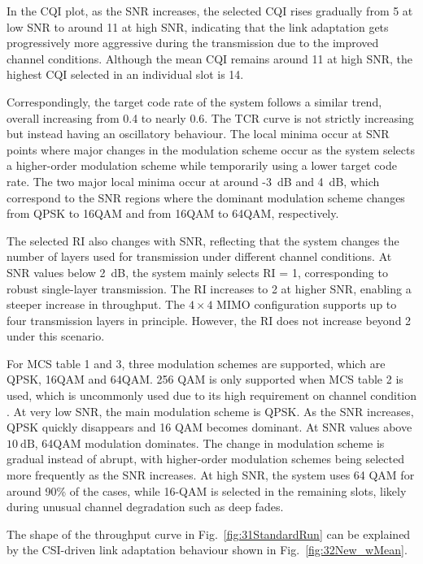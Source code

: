 \documentclass[a4paper,12pt,onecolumn]{article}
\begin{document}
		
		In the CQI plot, as the SNR increases, the selected CQI rises gradually from 5 at low SNR to around 11 at high SNR, indicating that the link adaptation gets progressively more aggressive during the transmission due to the improved channel conditions. Although the mean CQI remains around 11 at high SNR, the highest CQI selected in an individual slot is 14.
		
		Correspondingly, the target code rate of the system follows a similar trend, overall increasing from 0.4 to nearly 0.6. The TCR curve is not strictly increasing but instead having an oscillatory behaviour. The local minima occur at SNR points where major changes in the modulation scheme occur as the system selects a higher-order modulation scheme while temporarily
		using a lower target code rate. The two major local minima occur at around -3~dB and 4~dB, which correspond to the SNR regions where the dominant modulation scheme changes from QPSK to 16QAM and from 16QAM to 64QAM, respectively.
		
		The selected RI also changes with SNR, reflecting that the system changes the number of layers used for transmission under different channel conditions. At SNR values below 2~dB, the system mainly selects RI = 1, corresponding to robust single-layer transmission. The RI increases to 2 at higher SNR, enabling a steeper increase in throughput. The \(4 \times 4\) MIMO configuration supports up to four transmission layers in principle. However, the RI does not increase beyond 2 under this scenario.
		
		For MCS table 1 and 3, three modulation schemes are supported, which are QPSK, 16QAM and 64QAM. 256 QAM is only supported when MCS table 2 is used, which is uncommonly used due to its high requirement on channel condition \cite{3GPP2026a}. At very low SNR, the main modulation scheme is QPSK. As the SNR increases, QPSK quickly disappears and 16 QAM becomes dominant. At SNR values above \(10~\mathrm{dB}\), 64QAM modulation dominates. The change in modulation scheme is gradual instead of abrupt, with higher-order modulation schemes being selected more frequently as the SNR increases. At high SNR, the system uses 64 QAM for around 90\% of the cases, while 16-QAM is selected in the remaining slots, likely during unusual channel degradation such as deep fades.


			The shape of the throughput curve in Fig.~\ref{fig:31StandardRun} can be explained by the CSI-driven link adaptation behaviour shown in Fig.~\ref{fig:32New_wMean}. 
			
\end{document}
